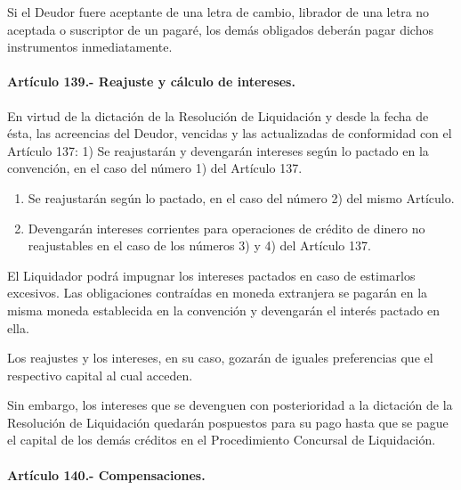 \documentclass[
]{book}
\begin{document}
Si el Deudor fuere aceptante de una letra de cambio, librador de una letra no aceptada o suscriptor de un pagaré, los demás obligados deberán pagar dichos instrumentos inmediatamente.

\hypertarget{artuxedculo-139.--reajuste-y-cuxe1lculo-de-intereses.}{%
\paragraph*{Artículo 139.- Reajuste y cálculo de intereses.}\label{artuxedculo-139.--reajuste-y-cuxe1lculo-de-intereses.}}

En virtud de la dictación de la Resolución de Liquidación y desde la fecha de ésta, las acreencias del Deudor, vencidas y las actualizadas de conformidad con el Artículo 137:
1) Se reajustarán y devengarán intereses según lo pactado en la convención, en el caso del número 1) del Artículo 137.

\begin{enumerate}
\def\labelenumi{\arabic{enumi})}
\setcounter{enumi}{1}
\item
  Se reajustarán según lo pactado, en el caso del número 2) del mismo Artículo.
\item
  Devengarán intereses corrientes para operaciones de crédito de dinero no reajustables en el caso de los números 3) y 4) del Artículo 137.
\end{enumerate}

El Liquidador podrá impugnar los intereses pactados en caso de estimarlos excesivos.
Las obligaciones contraídas en moneda extranjera se pagarán en la misma moneda establecida en la convención y devengarán el interés pactado en ella.

Los reajustes y los intereses, en su caso, gozarán de iguales preferencias que el respectivo capital al cual acceden.

Sin embargo, los intereses que se devenguen con posterioridad a la dictación de la Resolución de Liquidación quedarán pospuestos para su pago hasta que se pague el capital de los demás créditos en el Procedimiento Concursal de Liquidación.

\hypertarget{artuxedculo-140.--compensaciones.}{%
\paragraph*{Artículo 140.- Compensaciones.}\label{artuxedculo-140.--compensaciones.}}
\end{document}
